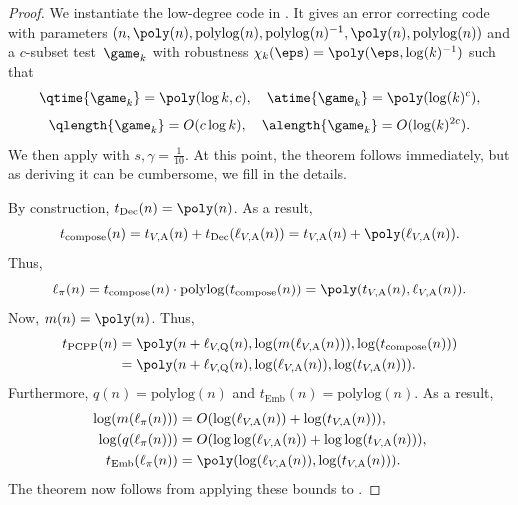\begin{proof}
We instantiate the low-degree code in .
It gives an error correcting code with parameters $(n, \poly(n), \mathrm{poly log}(n), \mathrm{poly log}(n)^{-1},\poly(n), \mathrm{polylog}(n))$
and a $c$-subset test~$\game_k$ with robustness $\chi_k(\eps) = \poly(\eps, \log(k)^{-1})$ such that
\begin{equation*}
\qtime{\game_k} = \poly(\log k, c),
\quad
\atime{\game_k} = \poly(\log(k)^c),
\end{equation*}
\begin{equation*}
\qlength{\game_k} = O(c \log k),
\quad
\alength{\game_k} = O(\log(k)^{2c}).
\end{equation*}
We then apply  with $s, \gamma = \tfrac{1}{10}$.
At this point, the theorem follows immediately,
but as deriving it can be cumbersome, we fill in the details.

By construction, $t_{\mathrm{Dec}}(n) = \poly(n)$.
As a result,
\begin{equation*}
t_{\mathrm{compose}}(n)
= t_{V, \mathrm{A}}(n) + t_{\mathrm{Dec}}(\ell_{V,\mathrm{A}}(n))
= t_{V, \mathrm{A}}(n) + \poly(\ell_{V,\mathrm{A}}(n)).
\end{equation*}
Thus,
\begin{equation*}
\ell_\pi(n)
= t_{\mathrm{compose}}(n) \cdot \mathrm{poly log}(t_{\mathrm{compose}}(n))
= \poly(t_{V, \mathrm{A}}(n), \ell_{V,\mathrm{A}}(n)).
\end{equation*}
Now, $m(n) = \poly(n)$. Thus,
\begin{align*}
t_{\mathrm{PCPP}}(n)
&= \poly(n + \ell_{V, \mathrm{Q}}(n), \log(m(\ell_{V, \mathrm{A}}(n))), \log(t_{\mathrm{compose}}(n)))\\
&= \poly(n + \ell_{V, \mathrm{Q}}(n), \log(\ell_{V, \mathrm{A}}(n)), \log(t_{V, \mathrm{A}}(n))).
\end{align*}
Furthermore, $q(n) = \mathrm{polylog}(n)$ and $t_{\mathrm{Emb}}(n) = \mathrm{poly log}(n)$.
As a result,
\begin{align*}
\log(m(\ell_\pi(n))) &= O(\log(\ell_{V,\mathrm{A}}(n))+ \log(t_{V, \mathrm{A}}(n))),\\
\log(q(\ell_\pi(n))) &= O(\log \log(\ell_{V,\mathrm{A}}(n))+ \log \log(t_{V, \mathrm{A}}(n))),\\
t_{\mathrm{Emb}}(\ell_\pi(n)) &= \poly(\log(\ell_{V, \mathrm{A}}(n)), \log(t_{V, \mathrm{A}}(n))).
\end{align*}
The theorem now follows from applying these bounds to .
\end{proof}

